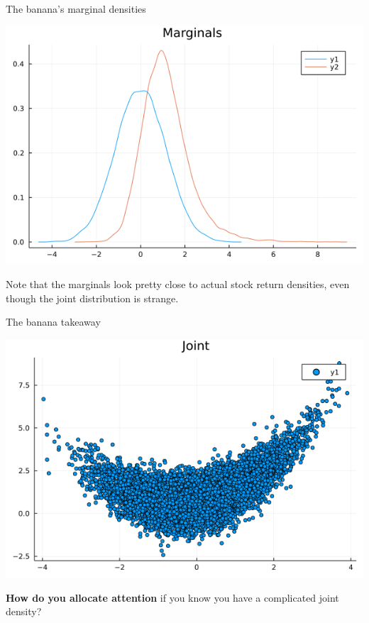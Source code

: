 \documentclass[
  ignorenonframetext,
]{beamer}
\begin{document}
\begin{frame}{The banana's marginal densities}
\protect\hypertarget{the-bananas-marginal-densities}{}
\begin{center}\includegraphics[width=0.5\paperheight]{complexity_files/figure-beamer/unnamed-chunk-8-1} \end{center}

Note that the marginals look pretty close to actual stock return
densities, even though the joint distribution is strange.
\end{frame}

\begin{frame}{The banana takeaway}
\protect\hypertarget{the-banana-takeaway}{}
\begin{center}\includegraphics[width=0.5\paperheight]{complexity_files/figure-beamer/unnamed-chunk-9-1} \end{center}

\textbf{How do you allocate attention} if you know you have a
complicated joint density?
\end{frame}
\end{document}
